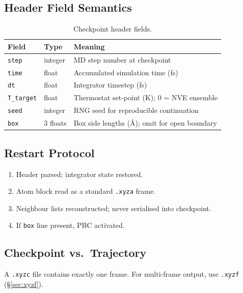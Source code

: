 \documentclass[12pt, a4paper, oneside]{article}
\begin{document}
\subsection{Header Field Semantics}

\begin{table}[htbp]
  \centering
  \caption{Checkpoint header fields.}
  \label{tab:xyzc_header}
  \begin{tabular}{llp{7.5cm}}
    \toprule
    Field & Type & Meaning \\
    \midrule
    \texttt{step}      & integer & MD step number at checkpoint \\
    \texttt{time}      & float   & Accumulated simulation time (fs) \\
    \texttt{dt}        & float   & Integrator timestep (fs) \\
    \texttt{T\_target} & float   & Thermostat set-point (K); 0 = NVE ensemble \\
    \texttt{seed}      & integer & RNG seed for reproducible continuation \\
    \texttt{box}       & 3 floats & Box side lengths (\AA); omit for open boundary \\
    \bottomrule
  \end{tabular}
\end{table}

\subsection{Restart Protocol}

\begin{enumerate}
  \item Header parsed; integrator state restored.
  \item Atom block read as a standard \texttt{.xyza} frame.
  \item Neighbour lists reconstructed; never serialised into checkpoint.
  \item If \texttt{box} line present, PBC activated.
\end{enumerate}

\subsection{Checkpoint vs.\ Trajectory}

A \texttt{.xyzc} file contains exactly one frame.  For multi-frame output,
use \texttt{.xyzf} (\S\ref{sec:xyzf}).

\end{document}
